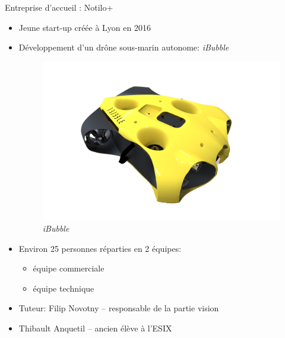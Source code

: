 \documentclass{bredelebeamer}
\begin{document}
\begin{frame}{Entreprise d'accueil : Notilo+}

\begin{itemize}
\item Jeune start-up créée à Lyon en 2016
\item Développement d'un dr\^one sous-marin autonome: \emph{iBubble}
\begin{figure}
\centering
\includegraphics[scale=0.05]{images/iBubble3.png}
\caption{\emph{iBubble}}
\end{figure}
\item Environ 25 personnes réparties en 2 équipes:
	\begin{itemize}
	\item équipe commerciale
	\item équipe technique
	\end{itemize}
\item Tuteur: Filip Novotny -- responsable de la partie vision
\item Thibault Anquetil -- ancien élève à l'ESIX
\end{itemize}

\end{frame}

\end{document}
